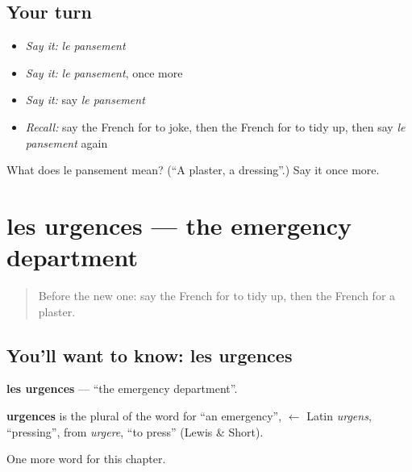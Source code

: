 \subsection*{Your turn}
\begin{itemize}
\raggedright
  \item \emph{Say it:} \emph{le pansement}
  \item \emph{Say it:} \emph{le pansement}, once more
  \item \emph{Say it:} say \emph{le pansement}
  \item \emph{Recall:} say the French for to joke, then the French for to tidy up, then say \emph{le pansement} again
\end{itemize}

\begin{tcolorbox}[breakable,colback=teal!4,colframe=teal!35!black,title={Before you move on}]
What does le pansement mean? (\textquotedblleft{}A plaster, a dressing\textquotedblright{}.) Say it once more.
\end{tcolorbox}
\section[les urgences]{les urgences — the emergency department}

\label{lesson:FR-C243-urgences}



\begin{quote}
Before the new one: say the French for to tidy up, then the French for a plaster.
\end{quote}

\subsection*{You'll want to know: les urgences}
\textbf{les urgences} — \textquotedblleft{}the emergency department\textquotedblright{}.

\begin{cousinweb}
\textbf{urgences} is the plural of the word for \textquotedblleft{}an emergency\textquotedblright{}, $\leftarrow$ Latin \emph{urgens}, \textquotedblleft{}pressing\textquotedblright{}, from \emph{urgere}, \textquotedblleft{}to press\textquotedblright{} (Lewis \& Short).
\end{cousinweb}

\begin{grammarlens}[title={What you've built}]
One more word for this chapter.
\end{grammarlens}

